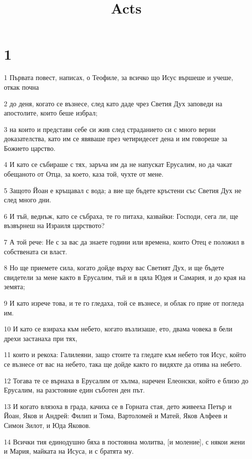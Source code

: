 

\title{Acts}


\chapter{1}

\par 1 Първата повест, написах, о Теофиле, за всичко що Исус вършеше и учеше, откак почна
\par 2 до деня, когато се възнесе, след като даде чрез Светия Дух заповеди на апостолите, които беше избрал;
\par 3 на които и представи себе си жив след страданието си с много верни доказателства, като им се явяваше през четиридесет дена и им говореше за Божието царство.
\par 4 И като се събираше с тях, заръча им да не напускат Ерусалим, но да чакат обещаното от Отца, за което, каза той, чухте от мене.
\par 5 Защото Йоан е кръщавал с вода; а вие ще бъдете кръстени със Светия Дух не след много дни.
\par 6 И тъй, веднъж, като се събраха, те го питаха, казвайки: Господи, сега ли, ще възвърнеш на Израиля царството?
\par 7 А той рече: Не с за вас да знаете години или времена, които Отец е положил в собствената си власт.
\par 8 Но ще приемете сила, когато дойде върху вас Светият Дух, и ще бъдете свидетели за мене както в Ерусалим, тъй и в цяла Юдея и Самария, и до края на земята;
\par 9 И като изрече това, и те го гледаха, той се възнесе, и облак го прие от погледа им.
\par 10 И като се взираха към небето, когато възлизаше, ето, двама човека в бели дрехи застанаха при тях,
\par 11 които и рекоха: Галилеяни, защо стоите та гледате към небето тоя Исус, който се възнесе от вас на небето, така ще дойде както го видяхте да отива на небето.
\par 12 Тогава те се върнаха в Ерусалим от хълма, наречен Елеонски, който е близо до Ерусалим, на разстояние един съботен ден път.
\par 13 И когато влязоха в града, качиха се в Горната стая, дето живееха Петър и Йоан, Яков и Андрей: Филип и Тома, Вартоломей и Матей, Яков Алфеев и Симон Зилот, и Юда Яковов.
\par 14 Всички тия единодушно бяха в постоянна молитва, [и моление], с някои жени и Мария, майката на Исуса, и с братята му.
